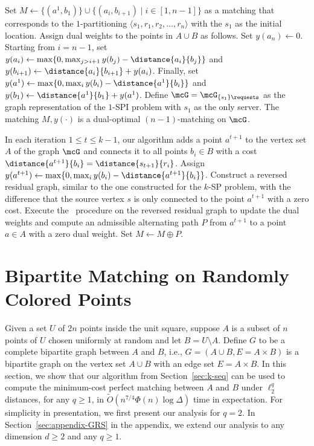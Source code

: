 Set $M\leftarrow \{(a^1, b_1)\}\cup \{(a_i, b_{i+1})\mid i\in[1, n-1]\}$ as a matching that corresponds to the $1$-partitioning $\langle s_1, r_1, r_2,\ldots, r_n\rangle$ with the $s_1$ as the initial location. Assign dual weights to the points in $A\cup B$ as follows. Set $y(a_n)\leftarrow 0$. Starting from $i=n-1$, set $y(a_{i})\leftarrow\max\{0, \max_{j>i+1}y(b_j)-\distance{a_{i}}{b_j}\}$ and $y(b_{i+1})\leftarrow\distance{a_{i}}{b_{i+1}} + y(a_{i})$. Finally, set $y(a^{1})\leftarrow\max\{0, \max_{i}y(b_i)-\distance{a^{1}}{b_i}\}$ and $y(b_1)\leftarrow \distance{a^{1}}{b_{1}} + y(a^{1})$. Define $\mcG=\mcG_{\{s_1\}\requests}$ as the graph representation of the $1$-SPI problem with $s_1$ as the only server. The matching $M, y(\cdot)$ is a dual-optimal $(n-1)$-matching on $\mcG$.

In each iteration $1\le t\le k-1$, our algorithm adds a point $a^{t+1}$ to the vertex set $A$ of the graph $\mcG$ and connects it to all points $b_i\in B$ with a cost $\distance{a^{t+1}}{b_i} = \distance{s_{t+1}}{r_i}$. Assign $y(a^{t+1})\leftarrow\max\{0, \max_{i}y(b_i)-\distance{a^{t+1}}{b_i}\}$. Construct a reversed residual graph, similar to the one constructed for the $k$-SP problem, with the difference that the source vertex $s$ is only connected to the point $a^{t+1}$ with a zero cost. Execute the \reverse\ procedure on the reversed residual graph to update the dual weights and compute an admissible alternating path $P$ from $a^{t+1}$ to a point $a\in A$ with a zero dual weight. Set $M\leftarrow M\oplus P$.










\section{Bipartite Matching on Randomly Colored Points}\label{sec:randomly-colored}
Given a set $U$ of $2n$ points inside the unit square, suppose $A$ is a subset of $n$ points of $U$ chosen uniformly at random and let $B=U\setminus A$. Define $G$ to be a complete bipartite graph between $A$ and $B$, i.e., $G=(A\cup B, E=A\times B)$ is a bipartite graph on the vertex set $A\cup B$ with an edge set $E=A\times B$. In this section, we show that our algorithm from Section~\ref{sec:k-seq} can be used to compute the minimum-cost perfect matching between $A$ and $B$ under $\ell_2^q$ distances, for any $q\ge 1$, in $\tilde{O}(n^{7/4}\Phi(n)\log\Delta)$ time in expectation. For simplicity in presentation, we first present our analysis for $q=2$. In Section~\ref{sec:appendix-GRS} in the appendix, we extend our analysis to any dimension $d\ge 2$ and any $q\ge 1$. 




